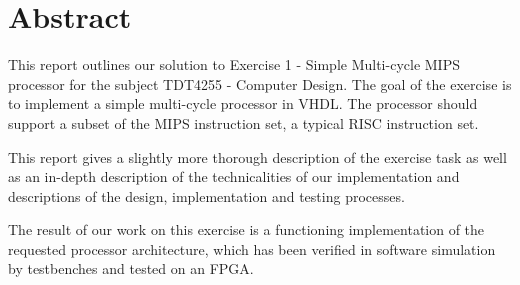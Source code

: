 \chapter*{Abstract}

This report outlines our solution to Exercise 1 - Simple Multi-cycle MIPS processor for the subject TDT4255 - Computer Design.
The goal of the exercise is to implement a simple multi-cycle processor in VHDL.
The processor should support a subset of the MIPS instruction set, a typical RISC instruction set.

This report gives a slightly more thorough description of the exercise task as well as an in-depth description of the technicalities of our implementation and descriptions of the design, implementation and testing processes.

The result of our work on this exercise is a functioning implementation of the requested processor architecture, which has been verified in software simulation by testbenches and tested on an FPGA.
